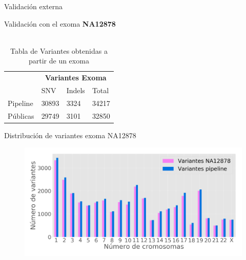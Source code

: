 \documentclass[xcolor=dvipsnames]{beamer}
\begin{document}
\begin{frame}{Validación externa}

Validación con el exoma \textbf{NA12878}
\\\
\begin{table}[H]
	\centering  
	\begin{tabular}{l|l|l|l|}
		\cline{2-4}
		& \multicolumn{3}{c|}{\textbf{Variantes Exoma}} \\ \cline{2-4} 
		& SNV           & Indels         & Total        \\ \hline
		\multicolumn{1}{|l|}{Pipeline} & 30893         & 3324           & 34217        \\ \hline
		\multicolumn{1}{|l|}{Públicas} & 29749         & 3101           & 32850        \\ \hline
	\end{tabular}
	\caption{Tabla de Variantes obtenidas a partir de un exoma}
	\label{tabla:tabla2}
\end{table} 
\end{frame}

\begin{frame}{Distribución de variantes exoma NA12878}
\begin{figure}
	\includegraphics[width=1\textwidth]{validacion2.png}
	\end{figure}
\end{frame}
\end{document}
